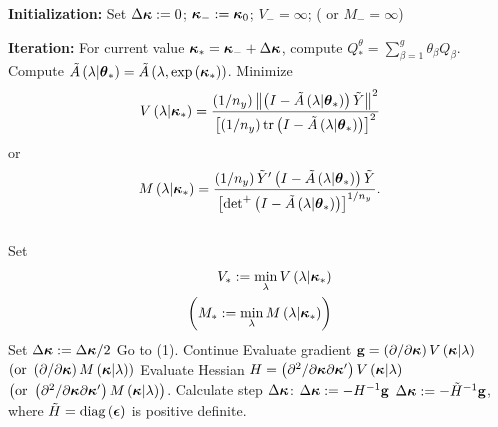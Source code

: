 \documentclass[12pt]{article}
\newcommand{\bfkappa}{\mbox{\boldmath $\kappa$}}
\newcommand{\tildeY}{\tilde{Y}}
\newcommand{\tildeA}{\tilde{A}}
\newcommand{\bftheta}{\mbox{\boldmath $\theta$}}
\newcommand{\bfepsilon}{\mbox{\boldmath $\epsilon$}}
\theoremstyle{definition}
\begin{document}
\begin{algorithm}[H]
\caption{ }
\begin{algorithmic}
\STATE \textbf{Initialization:} 
	\STATE Set $\Delta \bfkappa := 0$; \;$\bfkappa_{-}:=\bfkappa_{0}$; \;$V_- = \infty$; \;( or $M_- = \infty$)

\STATE \textbf{Iteration:} 
		\STATE For current value $\bfkappa_* = \bfkappa_- + \Delta \bfkappa$, compute $Q_*^\theta = \sum_{\beta = 1}^g \theta_\beta Q_\beta$. 
		\STATE Compute $\tildeA\left(\lambda \vert \bftheta_* \right) = \tildeA\left(\lambda, \exp\left({\bfkappa_*} \right)\right)$.
		\STATE Minimize \begin{equation*} V\left(\lambda \vert \bfkappa_* \right) = \frac{\left( 1/n_y \right)  \left \lVert \left(I - \tildeA\left(\lambda \vert \bftheta_* \right)\right) \tildeY \right\rVert^2}{\left[\left( 1/n_y \right) \textup{tr} \left(I - \tildeA\left(\lambda \vert \bftheta_* \right)\right)  \right]^2} \end{equation*} or  \begin{equation*} 
	M\left(\lambda \vert \bfkappa_* \right) = \frac{\left( 1/n_y \right) \tildeY' \left(I - \tildeA \left(\lambda \vert \bftheta_* \right)\right) \tildeY }{\left[ \mbox{det}^+\left(I - \tildeA\left(\lambda \vert \bftheta_* \right)\right)  \right]^{1/n_y}}.\end{equation*} \\
			Set 
			\begin{align*}
			V_* := \min \limits_\lambda V\left( \lambda \vert \bfkappa_* \right) \\
			\left( M_* := \min \limits_\lambda M\left(\lambda \vert \bfkappa_* \right) \right)
			\end{align*}
		 		\STATE Set $\Delta \bfkappa := \Delta \bfkappa/2$
		 		\STATE Go to (1).
		\ELSE
		\STATE Continue
		\ENDIF
		\STATE Evaluate gradient $\mathbf{g} = \left(\partial /\partial \bfkappa\right) V\left(\bfkappa \vert \lambda\right)$ $\left(\mbox{or }\left(\partial /\partial \bfkappa\right) M\left(\bfkappa \vert \lambda\right) \right)$
		\STATE Evaluate Hessian $H = \left(\partial^2 /\partial \bfkappa\partial \bfkappa' \right) V\left(\bfkappa \vert \lambda\right)$ $\left(\mbox{or } \left(\partial^2 /\partial \bfkappa\partial \bfkappa' \right) M\left(\bfkappa \vert \lambda \right) \right)$.
		\STATE Calculate step $\Delta \bfkappa$:
				\STATE $\Delta \bfkappa := -H^{-1} \mathbf{g}$
			\ELSE
				\STATE $\Delta \bfkappa := -\tilde{H}^{-1} \mathbf{g}$, where $\tilde{H} = \textup{diag}\left(\bfepsilon\right)$ is positive definite.

\end{algorithmic}
\end{algorithm}
\end{document}
